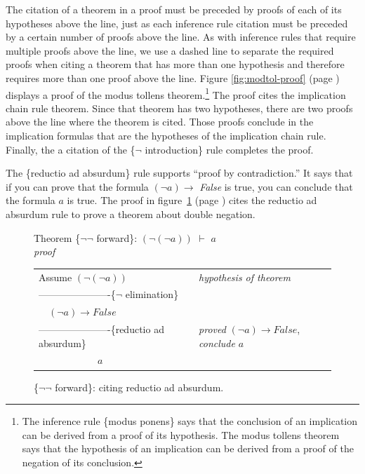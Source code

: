 {The citation of a theorem in a proof must be preceded by proofs of
each of its hypotheses above the line, just as
each inference rule citation must be preceded by a certain number of proofs above the line.
As with inference rules that require multiple proofs above the line,
we use a dashed line to separate the required proofs
when citing a theorem that has more than one hypothesis and therefore
requires more than one proof above the line.
Figure \ref{fig:modtol-proof} (page \pageref{fig:modtol-proof})
displays a proof of the modus tollens theorem.\footnote{The
inference rule \{modus ponens\} says that the conclusion of an implication
can be derived from a proof of its hypothesis.
The modus tollens theorem says that the hypothesis
of an implication can be derived from
a proof of the negation of its conclusion.}
The proof cites the implication chain rule theorem.
Since that theorem has two hypotheses, there are two proofs above
the line where the theorem is cited. Those proofs conclude in
the implication formulas that are the hypotheses of the implication chain rule.
Finally, the a citation of the \{$\neg$ introduction\} rule completes the proof.

The \{reductio ad absurdum\} rule supports
``proof by contradiction.''
It says that if you can prove that the formula
$(\neg a) \rightarrow$ \emph{False} is true,
you can conclude that the formula $a$ is true.
The proof in figure~\ref{fig:dbl-neg-fwd} (page \pageref{fig:dbl-neg-fwd})
cites the
reductio
ad absurdum rule to prove a theorem about double negation.

\begin{figure}
Theorem \{$\neg \neg$ forward\}: $(\neg(\neg a))$ $\vdash$ $a$\\
\emph{proof}
\begin{center}
\begin{spacing}{0.9}
\begin{tabular}{ll}
Assume $(\neg(\neg a))$                       &\emph{hypothesis of theorem}\\
----------------------\{$\neg$ elimination\}  &\\
~~$(\neg a) \rightarrow False$                &\\
----------------------\{reductio ad absurdum\}&\emph{proved} $(\neg a) \rightarrow False$, \emph{conclude} $a$\\
~~~~~~~~~~~~$a$                               &\\
\end{tabular}
\end{spacing}
\end{center}
\caption{\{$\neg \neg$ forward\}: citing reductio ad absurdum.}
\label{fig:dbl-neg-fwd}
\end{figure}

}
